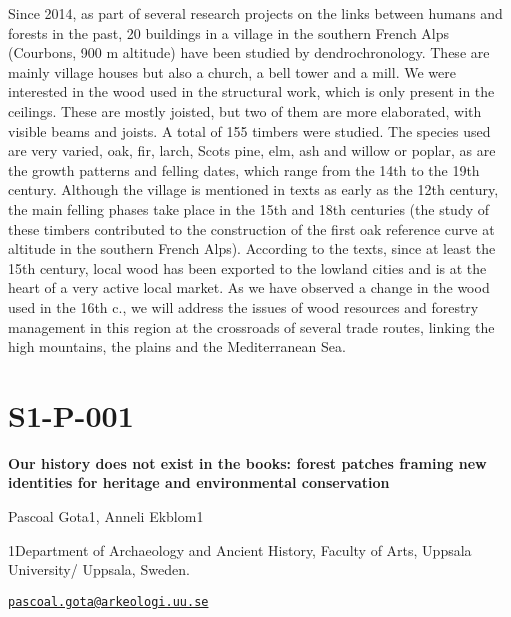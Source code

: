 \documentclass[
]{book}
\begin{document}
Since 2014, as part of several research projects on the links between
humans and forests in the past, 20 buildings in a village in the
southern French Alps (Courbons, 900 m altitude) have been studied by
dendrochronology. These are mainly village houses but also a church, a
bell tower and a mill. We were interested in the wood used in the
structural work, which is only present in the ceilings. These are mostly
joisted, but two of them are more elaborated, with visible beams and
joists. A total of 155 timbers were studied. The species used are very
varied, oak, fir, larch, Scots pine, elm, ash and willow or poplar, as
are the growth patterns and felling dates, which range from the 14th to
the 19th century. Although the village is mentioned in texts as early as
the 12th century, the main felling phases take place in the 15th and
18th centuries (the study of these timbers contributed to the
construction of the first oak reference curve at altitude in the
southern French Alps). According to the texts, since at least the 15th
century, local wood has been exported to the lowland cities and is at
the heart of a very active local market. As we have observed a change in
the wood used in the 16th c., we will address the issues of wood
resources and forestry management in this region at the crossroads of
several trade routes, linking the high mountains, the plains and the
Mediterranean Sea.

\hypertarget{s1-p-001}{%
\section*{S1-P-001}\label{s1-p-001}}

\textbf{Our history does not exist in the books: forest patches framing new
identities for heritage and environmental conservation}

Pascoal Gota1, Anneli Ekblom1

1Department of Archaeology and Ancient History, Faculty of Arts, Uppsala
University/ Uppsala, Sweden.

\href{mailto:pascoal.gota@arkeologi.uu.se}{\nolinkurl{pascoal.gota@arkeologi.uu.se}}
\end{document}
